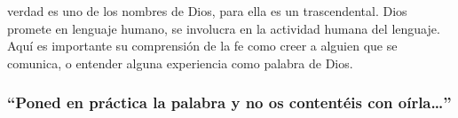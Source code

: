 verdad es uno de los nombres de Dios, para ella es un trascendental. Dios promete en lenguaje humano, se involucra en la actividad humana del lenguaje. Aquí es importante su comprensión de la fe como creer a alguien que se comunica, o entender alguna experiencia como palabra de Dios.

\subsubsection{\enquote{Poned en práctica la palabra y no os contentéis con oírla\ldots}}
